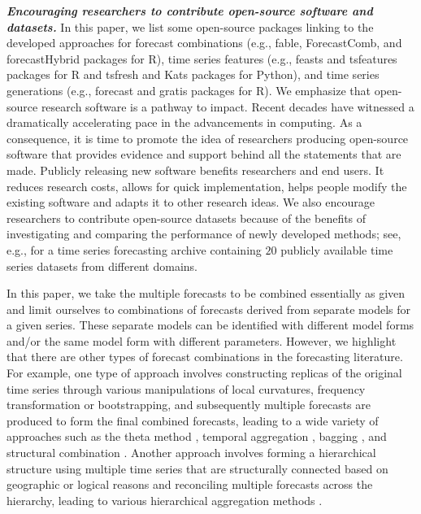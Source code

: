 \documentclass[a4paper,11pt]{article}
\newcommand{\pkg}[1]{{\normalfont\fontseries{b}\selectfont #1}}
\let\proglang=\textsf
\begin{document}
\textbf{\textit{Encouraging researchers to contribute open-source software and datasets.}} In this paper, we list some open-source packages linking to the developed approaches for forecast combinations (e.g., \pkg{fable}, \pkg{ForecastComb}, and \pkg{forecastHybrid} packages for \proglang{R}), time series features (e.g., \pkg{feasts} and \pkg{tsfeatures} packages for \proglang{R} and \pkg{tsfresh} and \pkg{Kats} packages for \proglang{Python}), and time series generations (e.g., \pkg{forecast} and \pkg{gratis} packages for \proglang{R}). We emphasize that open-source research software is a pathway to impact. Recent decades have witnessed a dramatically accelerating pace in the advancements in computing. As a consequence, it is time to promote the idea of researchers producing open-source software that provides evidence and support behind all the statements that are made. Publicly releasing new software benefits researchers and end users. It reduces research costs, allows for quick implementation, helps people modify the existing software and adapts it to other research ideas. We also encourage researchers to contribute open-source datasets because of the benefits of investigating and comparing the performance of newly developed methods; see, e.g., \citet{Godahewa2021-mo,Godahewa2021-wb} for a time series forecasting archive containing $20$ publicly available time series datasets from different domains.

In this paper, we take the multiple forecasts to be combined essentially as given and limit ourselves to combinations of forecasts derived from separate models for a given series. These separate models can be identified with different model forms and/or the same model form with different parameters. However, we highlight that there are other types of forecast combinations in the forecasting literature. For example, one type of approach involves constructing replicas of the original time series through various manipulations of local curvatures, frequency transformation or bootstrapping, and subsequently multiple forecasts are produced to form the final combined forecasts, leading to a wide variety of approaches such as the theta method \citep{Assimakopoulos2000-cc}, temporal aggregation \citep[e.g.,][]{Kourentzes2014-wz,Kourentzes2016-qq,Kourentzes2017-xe}, bagging \citep[e.g.,][]{Bergmeir2016-ae,Petropoulos2018-fw}, and structural combination \citep[e.g.,][]{Rendon-Sanchez2019-qm}. Another approach involves forming a hierarchical structure using multiple time series that are structurally connected based on geographic or logical reasons and reconciling multiple forecasts across the hierarchy, leading to various hierarchical aggregation methods \citep[e.g.,][]{Hyndman2011-sd,Wickramasuriya2019-fc,Taieb2021-tc,Hollyman2021-tn}.
\end{document}
